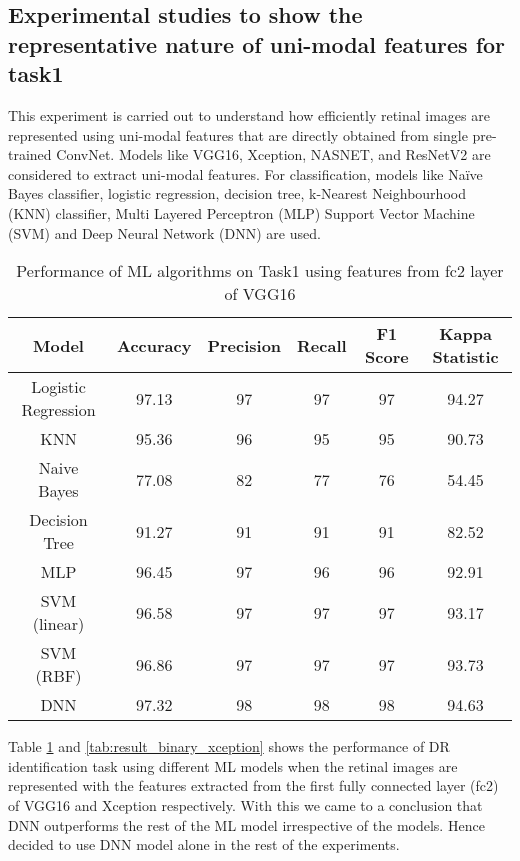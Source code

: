\documentclass[electronics,article,accept ,moreauthors,pdftex]{mdpi}
\begin{document}
\subsection{Experimental studies to show the representative nature of uni-modal features for task1}
This experiment is carried out to understand how  efficiently retinal images are represented using uni-modal features that are directly obtained from single pre-trained ConvNet.
Models like 
VGG16, Xception, NASNET, and ResNetV2 are considered to extract uni-modal features. 
For classification, models like Naïve Bayes classifier, logistic regression, decision tree, k-Nearest Neighbourhood (KNN) classifier, Multi Layered Perceptron (MLP) Support Vector Machine (SVM) and Deep Neural Network (DNN) are used.


\begin{table}[h!]
    \centering
    \caption{Performance of ML algorithms on Task1 using features from fc2 layer of VGG16}
    \label{tab:result_binary_vgg16_fc2}
    \begin{tabular}{|c|c|c|c|c|c|}
        \hline
        \textbf{Model} & \textbf{Accuracy} & \textbf{Precision} & \textbf{Recall} & \textbf{F1 Score} & \textbf{Kappa Statistic} \\ \hline
        Logistic Regression & 97.13 & 97 & 97 & 97 & 94.27 \\ \hline
        KNN                 & 95.36 & 96 & 95 & 95 & 90.73 \\ \hline
        Naive Bayes         & 77.08 & 82 & 77 & 76 & 54.45 \\ \hline
        Decision Tree       & 91.27 & 91 & 91 & 91 & 82.52 \\ \hline
        MLP                 & 96.45 & 97 & 96 & 96 & 92.91 \\ \hline
        SVM (linear)        & 96.58 & 97 & 97 & 97 & 93.17 \\ \hline
        SVM (RBF)           & 96.86 & 97 & 97 & 97 & 93.73 \\ \hline
        DNN                 & 97.32 & 98 & 98 & 98 & 94.63 \\ \hline
    \end{tabular}
\end{table}

Table \ref{tab:result_binary_vgg16_fc2} and \ref{tab:result_binary_xception}  shows the performance of DR identification task using different ML models  when the retinal images are represented with the features extracted from the first fully connected layer (fc2) of VGG16 and Xception respectively. 
With this we came to a conclusion that DNN outperforms the rest of the ML model irrespective of the models. Hence decided to use DNN model alone in the rest of the experiments.
\end{document}
